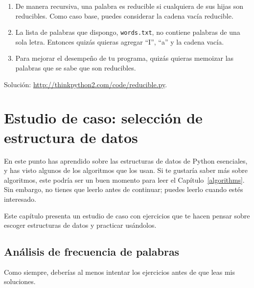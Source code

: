 \documentclass[10pt]{book}
\begin{document}
\begin{exercise}
\begin{enumerate}
\item De manera recursiva, una palabra es reducible si cualquiera de sus hijas
son reducibles.  Como caso base, puedes considerar la cadena vacía
reducible.

\item La lista de palabras que dispongo, {\tt words.txt}, no
contiene palabras de una sola letra.  Entonces quizás quieras agregar
``I'', ``a'' y la cadena vacía.

\item Para mejorar el desempeño de tu programa, quizás quieras
memoizar las palabras que se sabe que son reducibles.

\end{enumerate}

Solución: \url{http://thinkpython2.com/code/reducible.py}.

\end{exercise}








\chapter{Estudio de caso: selección de estructura de datos}

En este punto has aprendido sobre las estructuras de datos de Python esenciales,
y has visto algunos de los algoritmos que los usan.
Si te gustaría saber más sobre algoritmos, este podría ser un buen
momento para leer el Capítulo~\ref{algorithms}.
Sin embargo, no tienes que leerlo antes de continuar; puedes leerlo
cuando estés interesado.

Este capítulo presenta un estudio de caso con ejercicios que te hacen
pensar sobre escoger estructuras de datos y practicar usándolos.


\section{Análisis de frecuencia de palabras}
\label{analysis}

Como siempre, deberías al menos intentar los ejercicios
antes de que leas mis soluciones.
\end{document}

